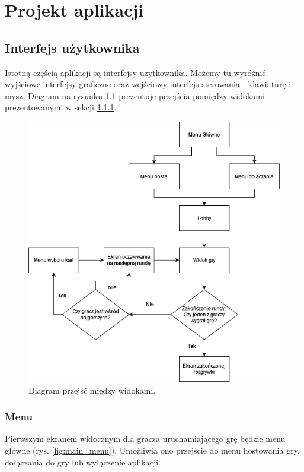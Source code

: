 \chapter{Projekt aplikacji}

\section{Interfejs użytkownika}\label{sec:interface_design}
Istotną częścią aplikacji są interfejsy użytkownika. Możemy tu wyróżnić wyjściowe interfejsy graficzne oraz wejściowy interfejs sterowania - klawiaturę i mysz. Diagram na rysunku \ref{fig:interface_diagram} prezentuje przejścia pomiędzy widokami prezentowanymi w sekcji \ref{sec:design_menu}.

\begin{figure}
    \centering
    \includegraphics[width=.8\linewidth]{Images/design/DiagramMenuTanks(1).png}
    \caption{Diagram przejść między widokami.}
    \label{fig:interface_diagram}
\end{figure}

\subsection{Menu}\label{sec:design_menu}
Pierwszym ekranem widocznym dla gracza uruchamiającego grę będzie menu główne (rys. \ref{fig:main_menu}). Umożliwia ono przejście do menu hostowania gry, dołączania do gry lub wyłączenie aplikacji. 

